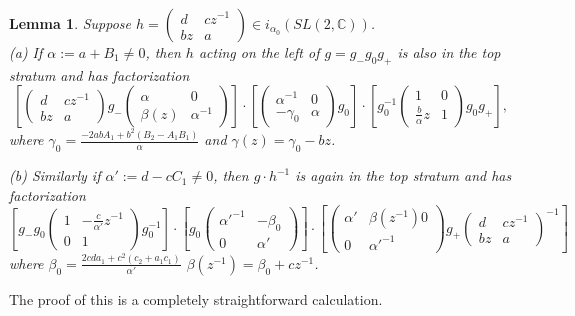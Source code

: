 \documentclass{amsart}
\newtheorem{lemma}{Lemma}
\theoremstyle{conjecture}
\theoremstyle{definition}
\theoremstyle{question}
\theoremstyle{questions}
\theoremstyle{remark}
\theoremstyle{remarks}
\theoremstyle{example}
\numberwithin{equation}{section}
\begin{document}
\begin{lemma} Suppose $h=\left(\begin{matrix} d&cz^{-1}\\
bz&a\end{matrix} \right)\in i_{\alpha_0}(SL(2,\mathbb C))$.\\

(a) If $\alpha:=a+B_1\ne 0$, then $h$ acting on the left of $g=g_{-}g_0g_{+}$ is also in the top stratum
and has factorization
$$[\left(\begin{matrix} d&cz^{-1}\\
bz&a\end{matrix} \right)g_{-}\left(\begin{matrix} \alpha&0\\
\beta(z)&\alpha^{-1}\end{matrix} \right)]
\cdot [\left(\begin{matrix} \alpha^{-1}&0\\
-\gamma_0&\alpha\end{matrix} \right)g_0]
\cdot [g_0^{-1}\left(\begin{matrix} 1&0\\
\frac {b}{\alpha}z&1\end{matrix} \right)g_0g_{+}],$$
where $\gamma_0=\frac {-2abA_1+b^2(B_2-A_1B_1)}{\alpha}$
and $\gamma(z)=\gamma_0-bz$.

(b) Similarly if $\alpha':= d-cC_1\ne 0$, then $g\cdot h^{-1}$ is again in the top stratum and
has factorization
$$[g_{-}g_0\left(\begin{matrix} 1&
-\frac {c}{\alpha'}z^{-1}\\0&1\end{matrix} \right)g_0^{-1}]
\cdot
[g_0\left(\begin{matrix} \alpha'^{-1}&-\beta_0\\
0&\alpha'\end{matrix} \right)]
\cdot [\left(\begin{matrix} \alpha'&\beta(z^{-1})0\\
0&\alpha'^{-1}\end{matrix} \right)g_{+}\left(\begin{matrix} d&cz^{-1}\\
bz&a\end{matrix} \right)^{-1}]$$
where $\beta_0=\frac {2cda_1+c^2(c_2+a_1c_1)}{\alpha'}$
$\beta (z^{-1})=\beta_0+cz^{-1}$.
\end{lemma}

The proof of this is a completely straightforward calculation.
\end{document}
